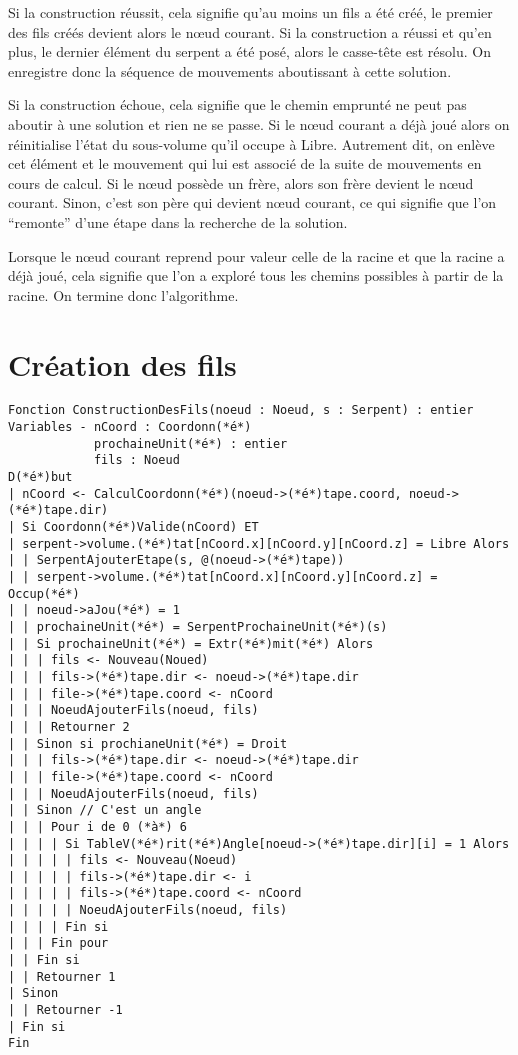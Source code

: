 Si la construction réussit, cela signifie qu'au moins un fils a été créé, le premier des fils créés devient alors le nœud courant. Si la construction a réussi et qu'en plus, le dernier élément du serpent a été posé, alors le casse-tête est résolu. On enregistre donc la séquence de mouvements aboutissant à cette solution. 

Si la construction échoue, cela signifie que le chemin emprunté ne peut pas aboutir à une solution et rien ne se passe. Si le nœud courant a déjà joué alors on réinitialise l'état du sous-volume qu'il occupe à Libre. Autrement dit, on enlève cet élément et le mouvement qui lui est associé de la suite de mouvements en cours de calcul. Si le nœud possède un frère, alors son frère devient le nœud courant. Sinon, c'est son père qui devient nœud courant, ce qui signifie que l'on ``remonte'' d'une étape dans la recherche de la solution.

Lorsque le nœud courant reprend pour valeur celle de la racine et que la racine a déjà joué, cela signifie que l'on a exploré tous les chemins possibles à partir de la racine. On termine donc l'algorithme.

\newpage
\section{Création des fils}

\begin{lstlisting}[caption=Algorithme de création des fils]
Fonction ConstructionDesFils(noeud : Noeud, s : Serpent) : entier
Variables - nCoord : Coordonn(*é*)
            prochaineUnit(*é*) : entier
            fils : Noeud
D(*é*)but
| nCoord <- CalculCoordonn(*é*)(noeud->(*é*)tape.coord, noeud->(*é*)tape.dir)
| Si Coordonn(*é*)Valide(nCoord) ET
| serpent->volume.(*é*)tat[nCoord.x][nCoord.y][nCoord.z] = Libre Alors
| | SerpentAjouterEtape(s, @(noeud->(*é*)tape))
| | serpent->volume.(*é*)tat[nCoord.x][nCoord.y][nCoord.z] = Occup(*é*)
| | noeud->aJou(*é*) = 1
| | prochaineUnit(*é*) = SerpentProchaineUnit(*é*)(s)
| | Si prochaineUnit(*é*) = Extr(*é*)mit(*é*) Alors
| | | fils <- Nouveau(Noued)
| | | fils->(*é*)tape.dir <- noeud->(*é*)tape.dir
| | | file->(*é*)tape.coord <- nCoord
| | | NoeudAjouterFils(noeud, fils)
| | | Retourner 2
| | Sinon si prochianeUnit(*é*) = Droit
| | | fils->(*é*)tape.dir <- noeud->(*é*)tape.dir
| | | file->(*é*)tape.coord <- nCoord
| | | NoeudAjouterFils(noeud, fils)
| | Sinon // C'est un angle
| | | Pour i de 0 (*à*) 6
| | | | Si TableV(*é*)rit(*é*)Angle[noeud->(*é*)tape.dir][i] = 1 Alors
| | | | | fils <- Nouveau(Noeud)
| | | | | fils->(*é*)tape.dir <- i
| | | | | fils->(*é*)tape.coord <- nCoord
| | | | | NoeudAjouterFils(noeud, fils)
| | | | Fin si
| | | Fin pour
| | Fin si
| | Retourner 1
| Sinon
| | Retourner -1
| Fin si
Fin
\end{lstlisting}


